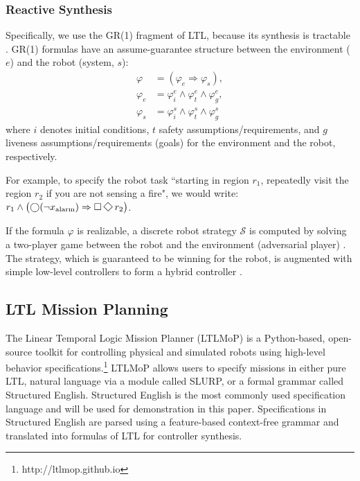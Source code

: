 \subsubsection*{Reactive Synthesis}\label{GR(1)}
Specifically, we use the GR(1) fragment of LTL, because its synthesis is tractable \cite{piterman_06}. GR(1) formulas have an assume-guarantee structure between the environment ($e$) and the robot (system, $s$):
\begin{align*}
	\varphi &= (\varphi_e \Rightarrow \varphi_s),\\
	\varphi_e &= \varphi_i^e \wedge \varphi_t^e \wedge \varphi_g^e,\\
	\varphi_s &= \varphi_i^s \wedge \varphi_t^s \wedge \varphi_g^s
\end{align*}
where $i$ denotes initial conditions, $t$ safety assumptions/requirements, and $g$ liveness assumptions/requirements (goals) for the environment and the robot, respectively.

For example, to specify the robot task ``starting in region $r_1$, repeatedly visit the region $r_2$ if you are not sensing a fire", we would write: $r_1 \wedge \left(\X(\neg x_{\text{alarm}}) \Rightarrow \G\F r_2 \right)$.

If the formula $\varphi$ is realizable, a discrete robot strategy $\mathcal{S}$ is computed by solving a two-player game between the robot and the environment (adversarial player) \cite{piterman_06}. The strategy, which is guaranteed to be winning for the robot, is augmented with simple low-level controllers to form a hybrid controller \cite{KGFP_TRO09}.

\subsection{LTL Mission Planning}\label{preliminariesB}

The Linear Temporal Logic Mission Planner (LTLMoP) \cite{Finucane2010} is a Python-based, open-source toolkit for controlling physical and simulated robots using high-level behavior specifications.\footnote{http://ltlmop.github.io} 
LTLMoP allows users to specify missions in either pure LTL, natural language via a module called SLURP, or a formal grammar called Structured English. Structured English is the most commonly used specification language and will be used for demonstration in this paper. Specifications in Structured English are parsed using a feature-based context-free grammar and translated into formulas of LTL for controller synthesis. 
